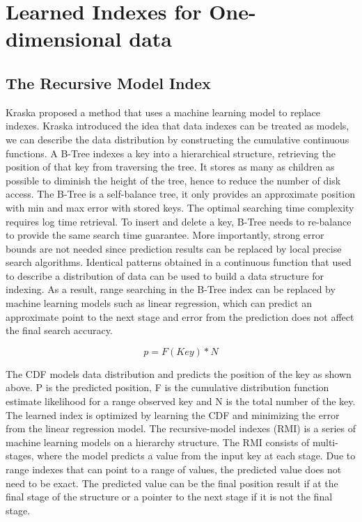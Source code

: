\section{Learned Indexes for One-dimensional data}
\subsection{The Recursive Model Index}
 Kraska \cite{Kraska:2017vh}  proposed a method that uses a machine learning model to replace indexes. Kraska introduced the idea that data indexes can be treated as models, we can describe the data distribution by constructing the cumulative continuous functions. A B-Tree indexes a key into a hierarchical structure, retrieving the position of that key from traversing the tree. It stores as many as children as possible to diminish the height of the tree, hence to reduce the number of disk access. The B-Tree is a self-balance tree, it only provides an approximate position with min and max error with stored keys. The optimal searching time complexity requires log time retrieval. To insert and delete a key, B-Tree needs to re-balance to provide the same search time guarantee. More importantly, strong error bounds are not needed since prediction results can be replaced by local precise search algorithms. Identical patterns obtained in a continuous function that used to describe a distribution of data can be used to build a data structure for indexing. As a result, range searching in the B-Tree index can be replaced by machine learning models such as linear regression, which can predict an approximate point to the next stage and error from the prediction does not affect the final search accuracy. 

\[p = F(Key) * N\]

The CDF models data distribution and predicts the position of the key as shown above. P is the predicted position, F is the cumulative distribution function estimate likelihood for a range observed key and N is the total number of the key. The learned index is optimized by learning the CDF and minimizing the error from the linear regression model. The recursive-model indexes (RMI) is a series of machine learning models on a hierarchy structure. The RMI consists of multi-stages, where the model predicts a value from the input key at each stage. Due to range indexes that can point to a range of values, the predicted value does not need to be exact. The predicted value can be the final position result if at the final stage of the structure or a pointer to the next stage if it is not the final stage. 

